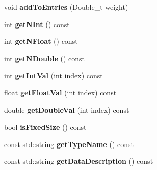 \begin{DoxyCompactItemize}
\item 
void {\bfseries add\-To\-Entries} (Double\-\_\-t weight)\label{classhistmgr_1_1Histogram2D_a98f58e8e6d67a3430fb9047552c95b17}

\item 
int {\bfseries get\-N\-Int} () const \label{classhistmgr_1_1Histogram2D_a89e0f3cdde009efa4214734afb619960}

\item 
int {\bfseries get\-N\-Float} () const \label{classhistmgr_1_1Histogram2D_acfe071923f9d990ec61568fd8c6e72f5}

\item 
int {\bfseries get\-N\-Double} () const \label{classhistmgr_1_1Histogram2D_aa3292dae2356c865b67dc62fdd1abfb5}

\item 
int {\bfseries get\-Int\-Val} (int index) const \label{classhistmgr_1_1Histogram2D_a39f56d711ed8d5921f7662d038ead2d1}

\item 
float {\bfseries get\-Float\-Val} (int index) const \label{classhistmgr_1_1Histogram2D_ab2fb60d75ad648ef7cdc259553a5c578}

\item 
double {\bfseries get\-Double\-Val} (int index) const \label{classhistmgr_1_1Histogram2D_a0ad3f76facb8a045e4ce6a0ac730e72a}

\item 
bool {\bfseries is\-Fixed\-Size} () const \label{classhistmgr_1_1Histogram2D_a9062278e2daa5a095356fbf331b3b921}

\item 
const std\-::string {\bfseries get\-Type\-Name} () const \label{classhistmgr_1_1Histogram2D_aae1137af1c5d111b441b80d74ef606ba}

\item 
const std\-::string {\bfseries get\-Data\-Description} () const \label{classhistmgr_1_1Histogram2D_aa9b8b32e5080f678d0b7e876c54ba453}

\end{DoxyCompactItemize}

